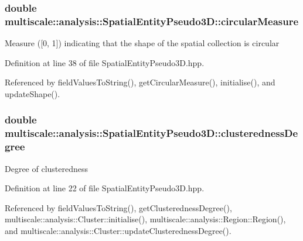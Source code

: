 \hypertarget{classmultiscale_1_1analysis_1_1SpatialEntityPseudo3D_aa4ac170fb21e9697358d47ba6ea7a267}{
\subsubsection[{circular\-Measure}]{\setlength{\rightskip}{0pt plus 5cm}double multiscale\-::analysis\-::\-Spatial\-Entity\-Pseudo3\-D\-::circular\-Measure\hspace{0.3cm}{\ttfamily [protected]}}}\label{classmultiscale_1_1analysis_1_1SpatialEntityPseudo3D_aa4ac170fb21e9697358d47ba6ea7a267}
Measure (\mbox{[}0, 1\mbox{]}) indicating that the shape of the spatial collection is circular 

Definition at line 38 of file Spatial\-Entity\-Pseudo3\-D.\-hpp.



Referenced by field\-Values\-To\-String(), get\-Circular\-Measure(), initialise(), and update\-Shape().

\hypertarget{classmultiscale_1_1analysis_1_1SpatialEntityPseudo3D_a22a84312e7c497cc5fbc4d8b41d8fd45}{
\subsubsection[{clusteredness\-Degree}]{\setlength{\rightskip}{0pt plus 5cm}double multiscale\-::analysis\-::\-Spatial\-Entity\-Pseudo3\-D\-::clusteredness\-Degree\hspace{0.3cm}{\ttfamily [protected]}}}\label{classmultiscale_1_1analysis_1_1SpatialEntityPseudo3D_a22a84312e7c497cc5fbc4d8b41d8fd45}
Degree of clusteredness 

Definition at line 22 of file Spatial\-Entity\-Pseudo3\-D.\-hpp.



Referenced by field\-Values\-To\-String(), get\-Clusteredness\-Degree(), multiscale\-::analysis\-::\-Cluster\-::initialise(), multiscale\-::analysis\-::\-Region\-::\-Region(), and multiscale\-::analysis\-::\-Cluster\-::update\-Clusteredness\-Degree().

